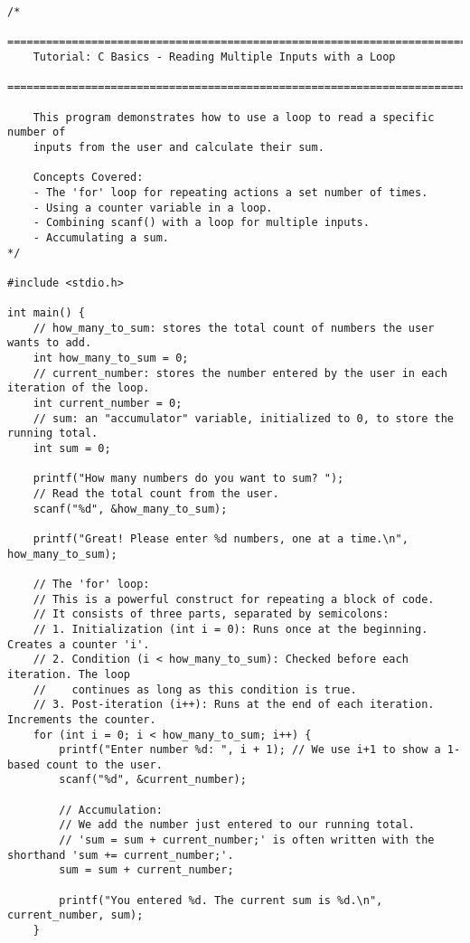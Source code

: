 \documentclass[11pt]{book}
\begin{document}
\clearpage
\begin{verbatim}
/*
    ================================================================================
    Tutorial: C Basics - Reading Multiple Inputs with a Loop
    ================================================================================

    This program demonstrates how to use a loop to read a specific number of
    inputs from the user and calculate their sum.

    Concepts Covered:
    - The 'for' loop for repeating actions a set number of times.
    - Using a counter variable in a loop.
    - Combining scanf() with a loop for multiple inputs.
    - Accumulating a sum.
*/

#include <stdio.h>

int main() {
    // how_many_to_sum: stores the total count of numbers the user wants to add.
    int how_many_to_sum = 0;
    // current_number: stores the number entered by the user in each iteration of the loop.
    int current_number = 0;
    // sum: an "accumulator" variable, initialized to 0, to store the running total.
    int sum = 0;

    printf("How many numbers do you want to sum? ");
    // Read the total count from the user.
    scanf("%d", &how_many_to_sum);

    printf("Great! Please enter %d numbers, one at a time.\n", how_many_to_sum);

    // The 'for' loop:
    // This is a powerful construct for repeating a block of code.
    // It consists of three parts, separated by semicolons:
    // 1. Initialization (int i = 0): Runs once at the beginning. Creates a counter 'i'.
    // 2. Condition (i < how_many_to_sum): Checked before each iteration. The loop
    //    continues as long as this condition is true.
    // 3. Post-iteration (i++): Runs at the end of each iteration. Increments the counter.
    for (int i = 0; i < how_many_to_sum; i++) {
        printf("Enter number %d: ", i + 1); // We use i+1 to show a 1-based count to the user.
        scanf("%d", &current_number);

        // Accumulation:
        // We add the number just entered to our running total.
        // 'sum = sum + current_number;' is often written with the shorthand 'sum += current_number;'.
        sum = sum + current_number;

        printf("You entered %d. The current sum is %d.\n", current_number, sum);
    }


\end{verbatim}
\end{document}
